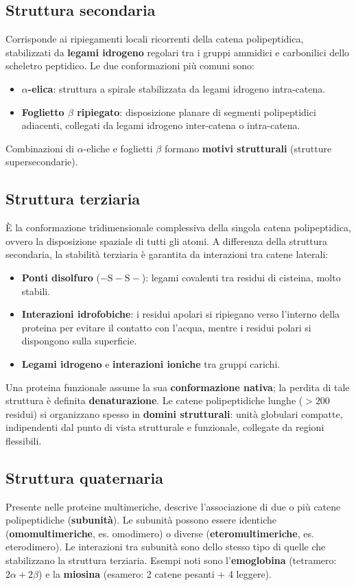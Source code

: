 \documentclass[12pt,a4paper]{report}
\begin{document}
\subsection{Struttura secondaria}
Corrisponde ai ripiegamenti locali ricorrenti della catena polipeptidica, stabilizzati da \textbf{legami idrogeno} regolari tra i gruppi ammidici e carbonilici dello scheletro peptidico. Le due conformazioni più comuni sono:
\begin{itemize}
\item \textbf{\(\alpha\)-elica}: struttura a spirale stabilizzata da legami idrogeno intra-catena.
\item \textbf{Foglietto \(\beta\) ripiegato}: disposizione planare di segmenti polipeptidici adiacenti, collegati da legami idrogeno inter-catena o intra-catena.
\end{itemize}
Combinazioni di \(\alpha\)-eliche e foglietti \(\beta\) formano \textbf{motivi strutturali} (strutture supersecondarie).

\subsection{Struttura terziaria}
È la conformazione tridimensionale complessiva della singola catena polipeptidica, ovvero la disposizione spaziale di tutti gli atomi. A differenza della struttura secondaria, la stabilità terziaria è garantita da interazioni tra catene laterali:
\begin{itemize}
\item \textbf{Ponti disolfuro} (\(-\mathrm{S-S-}\)): legami covalenti tra residui di cisteina, molto stabili.
\item \textbf{Interazioni idrofobiche}: i residui apolari si ripiegano verso l'interno della proteina per evitare il contatto con l'acqua, mentre i residui polari si dispongono sulla superficie.
\item \textbf{Legami idrogeno} e \textbf{interazioni ioniche} tra gruppi carichi.
\end{itemize}
Una proteina funzionale assume la sua \textbf{conformazione nativa}; la perdita di tale struttura è definita \textbf{denaturazione}.
Le catene polipeptidiche lunghe (\(>200\) residui) si organizzano spesso in \textbf{domini strutturali}: unità globulari compatte, indipendenti dal punto di vista strutturale e funzionale, collegate da regioni flessibili.

\subsection{Struttura quaternaria}
Presente nelle proteine multimeriche, descrive l'associazione di due o più catene polipeptidiche (\textbf{subunità}). Le subunità possono essere identiche (\textbf{omomultimeriche}, es. omodimero) o diverse (\textbf{eteromultimeriche}, es. eterodimero). Le interazioni tra subunità sono dello stesso tipo di quelle che stabilizzano la struttura terziaria. Esempi noti sono l'\textbf{emoglobina} (tetramero: \(2\alpha + 2\beta\)) e la \textbf{miosina} (esamero: 2 catene pesanti + 4 leggere).
\end{document}
